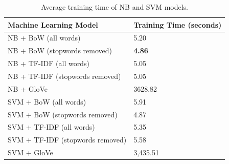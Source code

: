 \documentclass[a4paper,twoside,phd]{BYUPhys}
\begin{document}
\begin{table}[H]
	\centering
	
	\begin{tabular}{|p{4.2cm}|p{5cm}|}
		\hline
		
		\textbf{Machine Learning \newline Model} & \textbf{Training Time (seconds)}                                                                                                                                                                                                                                                                                                                                                    \\
		\hline                                                                                                                                              
		
		NB + BoW (all words)  & 5.20  \\
		\hline
		
		NB + BoW \newline (stopwords  removed)  & \textbf{4.86}  \\
		\hline
		
		NB + TF-IDF \newline (all words) & 5.05 \\
		\hline
		
		NB + TF-IDF \newline (stopwords removed) & 5.05 \\
		\hline
		
		NB + GloVe & 3628.82 \\
		\hline                                                                                                                                             
		
		SVM + BoW  \newline (all words)  & 5.91  \\
		\hline
		
		SVM + BoW \newline (stopwords removed)  & 4.87  \\
		\hline
		
		SVM + TF-IDF \newline (all words) & 5.35 \\
		\hline
		
		SVM + TF-IDF \newline (stopwords removed) & 5.58 \\
		\hline
		
		SVM + GloVe & 3,435.51 \\
		\hline
		
	\end{tabular}
	\caption{Average training time of NB and SVM models.}
	\label{table:MLTrainingTime}
\end{table}
\end{document}
